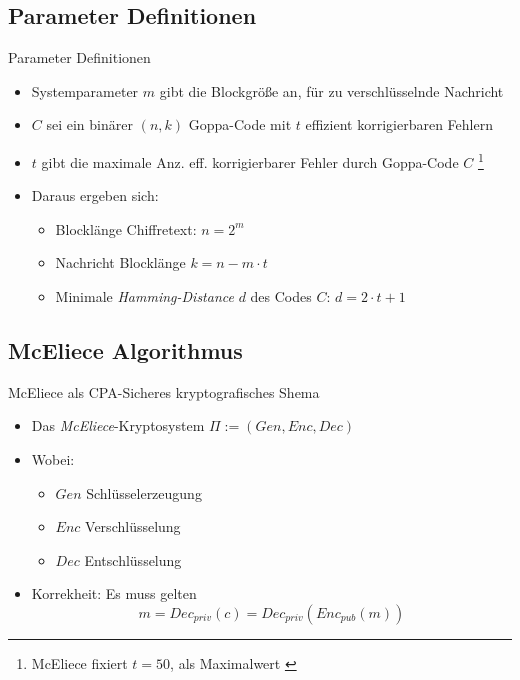\documentclass[11pt%
,aspectratio=169%
]{beamer}
\begin{document}
\subsection{Parameter Definitionen}
\begin{frame}{Parameter Definitionen}
    \begin{itemize}
        \item Systemparameter $m$ gibt die Blockgröße an, für zu verschlüsselnde Nachricht
        \item $C$ sei ein binärer $(n,k)$ Goppa-Code mit $t$ effizient korrigierbaren Fehlern
        \item $t$ gibt die maximale Anz. eff. korrigierbarer Fehler durch Goppa-Code $C$ \footnote{McEliece fixiert $t=50$, als Maximalwert \cite{McEliece1978public}}
        \item Daraus ergeben sich:
        \begin{itemize}
            \item Blocklänge Chiffretext: $n = 2^m$
            \item Nachricht Blocklänge $k = n - m \cdot t$
            \item Minimale \emph{Hamming-Distance} $d$ des Codes $C$: $d = 2 \cdot t + 1$
        \end{itemize}
    \end{itemize}   
\end{frame}

\subsection{McEliece Algorithmus}
\begin{frame}{McEliece als CPA-Sicheres kryptografisches Shema}
    \begin{itemize}
        \item Das \emph{McEliece}-Kryptosystem $\Pi := (Gen, Enc, Dec)$
        \item Wobei:
        \begin{itemize}
            \item $Gen$ Schlüsselerzeugung
            \item $Enc$ Verschlüsselung
            \item $Dec$ Entschlüsselung
        \end{itemize}
        \item Korrekheit: Es muss gelten
        $$
            m = Dec_{priv}(c) = Dec_{priv} (Enc_{pub}(m))
        $$
    \end{itemize}
\end{frame}
\end{document}
